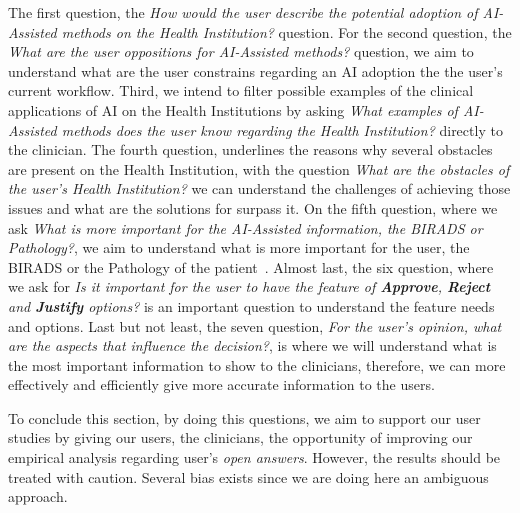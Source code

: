 The first question, the \textit{How would the user describe the potential adoption of \textit{AI-Assisted} methods on the Health Institution?} question. For the second question, the \textit{What are the user oppositions for \textit{AI-Assisted} methods?} question, we aim to understand what are the user constrains regarding an AI adoption the the user's current workflow. Third, we intend to filter possible examples of the clinical applications of AI on the Health Institutions by asking \textit{What examples of \textit{AI-Assisted} methods does the user know regarding the Health Institution?} directly to the clinician. The fourth question, underlines the reasons why several obstacles are present on the Health Institution, with the question \textit{What are the obstacles of the user's Health Institution?} we can understand the challenges of achieving those issues and what are the solutions for surpass it. On the fifth question, where we ask \textit{What is more important for the \textit{AI-Assisted} information, the BIRADS or Pathology?}, we aim to understand what is more important for the user, the BIRADS or the Pathology of the patient~\cite{elverici2015nonpalpable}. Almost last, the six question, where we ask for \textit{Is it important for the user to have the feature of \textbf{Approve}, \textbf{Reject} and \textbf{Justify} options?} is an important question to understand the feature needs and options. Last but not least, the seven question, \textit{For the user's opinion, what are the aspects that influence the decision?}, is where we will understand what is the most important information to show to the clinicians, therefore, we can more effectively and efficiently give more accurate information to the users.

To conclude this section, by doing this questions, we aim to support our user studies by giving our users, the clinicians, the opportunity of improving our empirical analysis regarding user's \textit{open answers}. However, the results should be treated with caution. Several bias exists since we are doing here an ambiguous approach.

\clearpage